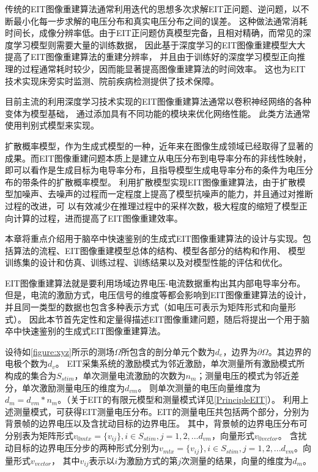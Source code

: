 
传统的EIT图像重建算法通常利用迭代的思想多次求解EIT正问题、逆问题，以不断最小化每一步求解的电压分布和真实电压分布之间的误差。
这种做法通常消耗时间长，成像分辨率低。由于EIT正问题仿真模型完备，且相对精确，而常见的深度学习模型则需要大量的训练数据，
因此基于深度学习的EIT图像重建模型大大提高了EIT图像重建算法的重建分辨率，
并且由于训练好的深度学习模型正向推理的过程通常耗时较少，因而能显著提高图像重建算法的时间效率。
这也为EIT技术实现床旁实时监测、院前疾病检测提供了技术保障。

目前主流的利用深度学习技术实现的EIT图像重建算法通常以卷积神经网络的各种变体为模型基础，
通过添加具有不同功能的模块来优化网络性能。
此类方法通常使用判别式模型来实现。

扩散概率模型，作为生成式模型的一种，近年来在图像生成领域已经取得了显著的成果。而EIT图像重建问题本质上是建立从电压分布到电导率分布的非线性映射，
即可以看作是生成目标为电导率分布，且指导模型生成电导率分布的条件为电压分布的带条件的扩散概率模型。
利用扩散模型实现EIT图像重建算法，由于扩散模型加噪声、去噪声的过程而一定程度上提高了模型抗噪声的能力，并且通过对推断过程的改进，可
以有效减少在推理过程中的采样次数，极大程度的缩短了模型正向计算的过程，进而提高了EIT图像重建效率。

本章将重点介绍用于脑卒中快速鉴别的生成式EIT图像重建算法的设计与实现。包括算法的流程、EIT图像重建模型总体的结构、模型各部分的结构和作用、
模型训练集的设计和仿真、训练过程、训练结果以及对模型性能的评估和优化。




EIT图像重建算法就是要利用场域边界电压-电流数据重构出其内部电导率分布。
但是，电流的激励方式，电压信号的维度等都会影响到EIT图像重建算法的设计，并且同一类型的数据也包含多种表示方式（如电压可表示为矩阵形式和向量形式）。
因此本节首先定性和定量得描述EIT图像重建问题，随后将提出一个用于脑卒中快速鉴别的生成式EIT图像重建算法。


设待如\cref{figure:xyz}所示的测场$\Omega$所包含的剖分单元个数为$d_e$，边界为$\partial \Omega$。其边界的电极个数为$d_v$。
EIT采集系统的激励模式为邻近激励，单次测量所有激励模式所构成的集合为$S_{stim}$，单次测量电流激励的次数为$n_m$；测量电压的模式为邻近差分，单次激励测量电压的维度为$d_{vm}$。
则单次测量的电压向量维度为$d_m = d_{vm} * n_m$。（关于EIT的有限元模型和测量模式详见\cref{PrincipleEIT}）。
利用上述测量模式，可获得EIT测量电压分布。EIT的测量电压共包括两个部分，分别为背景帧的边界电压以及含扰动目标的边界电压。
其中，背景帧的边界电压分布可分别表为矩阵形式$v_{0mtx} = \{v_{ij}\}, i \in S_{stim}, j =1,2,...d_{vm}$，向量形式$v_{0vector}$。
含扰动目标的边界电压分步的两种形式分别为$v_{mtx} = \{v_{ij}\}, i \in S_{stim}, j =1,2,...d_{vm}$。向量形式$v_{vector}$，
其中$v_{ij}$表示以$i$为激励方式的第$j$次测量的结果，向量的维度为$d_m$。

